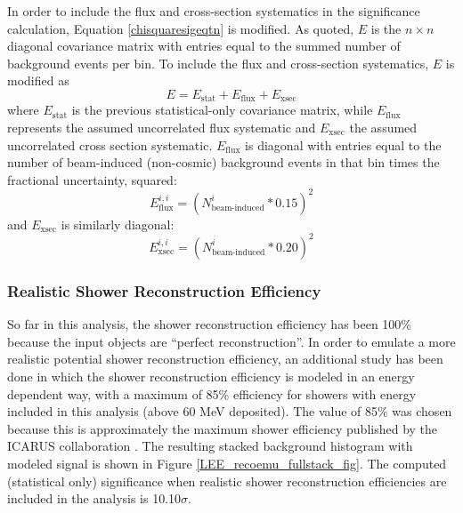 In order to include the flux and cross-section systematics in the significance calculation, Equation \ref{chisquaresigeqtn} is modified. As quoted, $E$ is the $n\times n$ diagonal covariance matrix with entries equal to the summed number of background events per bin. To include the flux and cross-section systematics, $E$ is modified as
\begin{equation}\label{LEE_emtx_systematics}
E = E_{\text{stat}} + E_{\text{flux}} + E_{\text{xsec}}
\end{equation}
where $E_{\text{stat}}$ is the previous statistical-only covariance matrix, while $E_{\text{flux}}$ represents the assumed uncorrelated flux systematic and $E_{\text{xsec}}$ the assumed uncorrelated cross section systematic. $E_{\text{flux}}$ is diagonal with entries equal to the number of beam-induced (non-cosmic) background events in that bin times the fractional uncertainty, squared:
\begin{equation}\label{LEE_flux_emtx}
E_{\text{flux}}^{i,i} = (N_{\text{beam-induced}}^i*0.15)^2
\end{equation}
and $E_{\text{xsec}}$ is similarly diagonal:
\begin{equation}\label{LEE_xsec_emtx}
E_{\text{xsec}}^{i,i} = (N_{\text{beam-induced}}^i*0.20)^2
\end{equation}


\subsubsection{Realistic Shower Reconstruction Efficiency}
So far in this analysis, the shower reconstruction efficiency has been 100\% because the input objects are ``perfect reconstruction''. In order to emulate a more realistic potential shower reconstruction efficiency, an additional study has been done in which the shower reconstruction efficiency is modeled in an energy dependent way, with a maximum of 85\% efficiency for showers with energy included in this analysis (above 60 MeV deposited). The value of 85\% was chosen because this is approximately the maximum shower efficiency published by the ICARUS collaboration \cite{ICARUS_showereff_source}. The resulting stacked background histogram with modeled signal is shown in Figure \ref{LEE_recoemu_fullstack_fig}. The computed (statistical only) significance when realistic shower reconstruction efficiencies are included in the analysis is 10.10$\sigma$.

